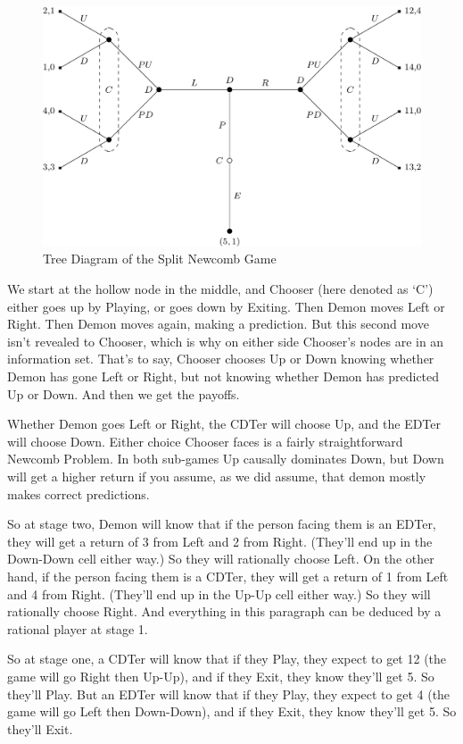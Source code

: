 \documentclass[
  12pt,
]{article}
\begin{document}
\begin{figure}
\centering
\includegraphics{war-on-war_files/figure-latex/first-anti-war-1.png}
\caption{\label{fig:first-anti-war}Tree Diagram of the Split Newcomb Game}
\end{figure}

We start at the hollow node in the middle, and Chooser (here denoted as `C') either goes up by Playing, or goes down by Exiting. Then Demon moves Left or Right. Then Demon moves again, making a prediction. But this second move isn't revealed to Chooser, which is why on either side Chooser's nodes are in an information set. That's to say, Chooser chooses Up or Down knowing whether Demon has gone Left or Right, but not knowing whether Demon has predicted Up or Down. And then we get the payoffs.

Whether Demon goes Left or Right, the CDTer will choose Up, and the EDTer will choose Down. Either choice Chooser faces is a fairly straightforward Newcomb Problem. In both sub-games Up causally dominates Down, but Down will get a higher return if you assume, as we did assume, that demon mostly makes correct predictions.

So at stage two, Demon will know that if the person facing them is an EDTer, they will get a return of 3 from Left and 2 from Right. (They'll end up in the Down-Down cell either way.) So they will rationally choose Left. On the other hand, if the person facing them is a CDTer, they will get a return of 1 from Left and 4 from Right. (They'll end up in the Up-Up cell either way.) So they will rationally choose Right. And everything in this paragraph can be deduced by a rational player at stage 1.

So at stage one, a CDTer will know that if they Play, they expect to get 12 (the game will go Right then Up-Up), and if they Exit, they know they'll get 5. So they'll Play. But an EDTer will know that if they Play, they expect to get 4 (the game will go Left then Down-Down), and if they Exit, they know they'll get 5. So they'll Exit.
\end{document}
